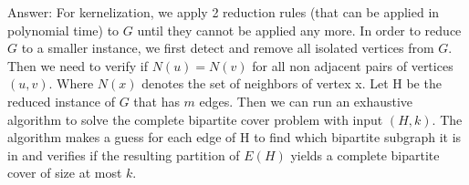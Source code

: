\documentclass{article}
\begin{document}
Answer: For kernelization, we apply 2 reduction rules (that can be applied in polynomial time) to $G$ until they cannot be applied any more. In order to reduce $G$ to a smaller instance, we first detect and remove all isolated vertices from $G$. Then we need to verify if $N(u) = N(v)$ for all non adjacent pairs of vertices $(u, v)$. Where $N(x)$ denotes the set of neighbors of vertex x. Let H be the reduced instance of $G$ that has $m$ edges. Then we can run an exhaustive algorithm to solve the complete bipartite cover problem with input $(H, k)$. The algorithm makes a guess for each edge of H to find which bipartite subgraph it is in and verifies if the resulting partition of $E(H)$ yields a complete bipartite cover of size at most $k$. \\ \newline
\end{document}
